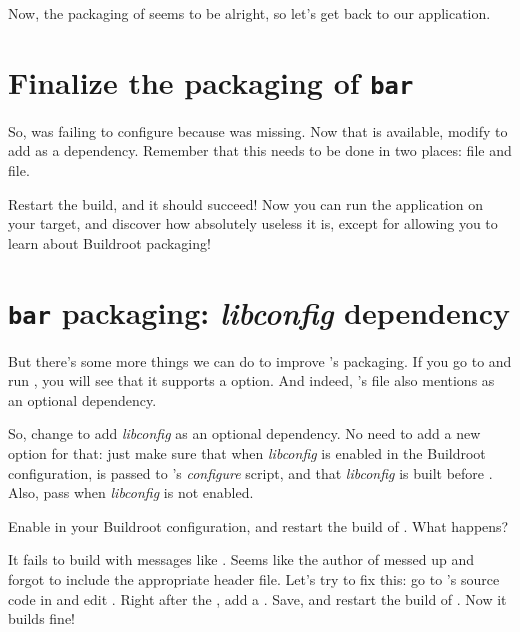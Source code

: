 Now, the packaging of  seems to be alright, so let's get
back to our  application.

\section{Finalize the packaging of {\tt bar}}

So,  was failing to configure because  was
missing. Now that  is available, modify  to add
 as a dependency. Remember that this needs to be done in
two places:  file and  file.

Restart the build, and it should succeed! Now you can run the
 application on your target, and discover how absolutely
useless it is, except for allowing you to learn about Buildroot
packaging!

\section{{\tt bar} packaging: {\em libconfig} dependency}

But there's some more things we can do to improve 's
packaging. If you go to  and run
, you will see that it supports a
 option. And indeed, 's 
file also mentions  as an optional dependency.

So, change  to add {\em libconfig} as an optional
dependency. No need to add a new  option for that:
just make sure that when {\em libconfig} is enabled in the Buildroot
configuration,  is passed to 's {\em
configure} script, and that {\em libconfig} is built before
. Also, pass  when {\em libconfig}
is not enabled.

Enable  in your Buildroot configuration, and restart
the build of . What happens?

It fails to build with messages like . Seems like the author of  messed up and forgot
to include the appropriate header file. Let's try to fix this: go to
's source code in  and edit
. Right after the ,
add a . Save, and restart the build of
. Now it builds fine!

